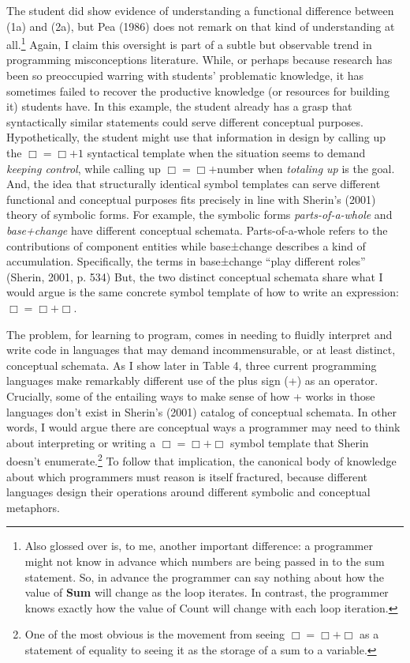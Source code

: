 The student did show evidence of understanding a functional difference
between (1a) and (2a), but Pea (1986) does not remark on that kind of
understanding at all.\footnote{Also glossed over is, to me, another
  important difference: a programmer might not know in advance which
  numbers are being passed in to the sum statement. So, in advance the
  programmer can say nothing about how the value of \textbf{Sum} will
  change as the loop iterates. In contrast, the programmer knows exactly
  how the value of Count will change with each loop iteration.} Again, I
claim this oversight is part of a subtle but observable trend in
programming misconceptions literature. While, or perhaps because
research has been so preoccupied warring with students' problematic
knowledge, it has sometimes failed to recover the productive knowledge
(or resources for building it) students have. In this example, the
student already has a grasp that syntactically similar statements could
serve different conceptual purposes. Hypothetically, the student might
use that information in design by calling up the $\Box=︎ \Box + 1$ syntactical
template when the situation seems to demand \emph{keeping control},
while calling up $\Box= ︎\Box + \mathrm{number}$ when \emph{totaling up} is the goal.
And, the idea that structurally identical symbol templates can serve
different functional and conceptual purposes fits precisely in line with
Sherin's (2001) theory of symbolic forms. For example, the symbolic
forms \emph{parts-of-a-whole} and \emph{base+change} have different
conceptual schemata. Parts-of-a-whole refers to the contributions of
component entities while base±change describes a kind of accumulation.
Specifically, the terms in base±change ``play different roles'' (Sherin,
2001, p. 534) But, the two distinct conceptual schemata share what I
would argue is the same concrete symbol template of how to write an
expression: $\Box=︎ \Box + \Box$.

The problem, for learning to program, comes in needing to fluidly
interpret and write code in languages that may demand incommensurable,
or at least distinct, conceptual schemata. As I show later in Table 4,
three current programming languages make remarkably different use of the
plus sign (+) as an operator. Crucially, some of the entailing ways to
make sense of how + works in those languages don't exist in Sherin's
(2001) catalog of conceptual schemata. In other words, I would argue
there are conceptual ways a programmer may need to think about
interpreting or writing a $\Box=︎ \Box +\Box$ symbol template that Sherin doesn't
enumerate.\footnote{One of the most obvious is the movement from seeing
  $\Box=︎ \Box +\Box$ as a statement of equality to seeing it as the storage of a
  sum to a variable.} To follow that implication, the canonical body of
knowledge about which programmers must reason is itself fractured,
because different languages design their operations around different
symbolic and conceptual metaphors.

